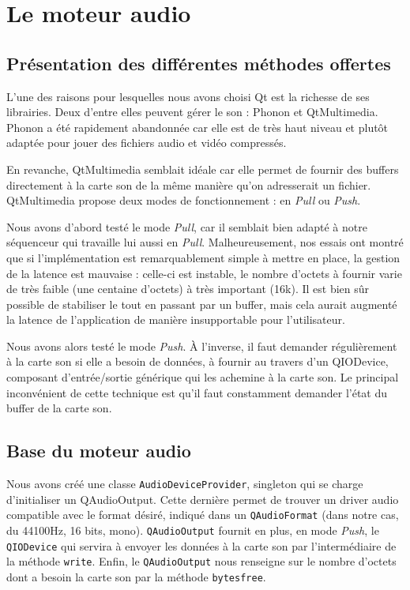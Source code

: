 \section{Le moteur audio}

\subsection{Présentation des différentes méthodes offertes}

L'une des raisons pour lesquelles nous avons choisi Qt est la
richesse de ses librairies. Deux d'entre elles peuvent gérer le son
: Phonon et QtMultimedia. Phonon a été rapidement abandonnée car
elle est de très haut niveau et plutôt adaptée pour jouer des
fichiers audio et vidéo compressés.

En revanche, QtMultimedia semblait idéale car elle permet de
fournir des buffers directement à la carte son de la même manière
qu'on adresserait un fichier. QtMultimedia propose deux modes de
fonctionnement : en \emph{Pull} ou \emph{Push}.

Nous avons d'abord testé le mode \emph{Pull}, car il semblait bien
adapté à notre séquenceur qui travaille lui aussi en \emph{Pull}.
Malheureusement, nos essais ont montré que si l'implémentation est
remarquablement simple à mettre en place, la gestion de la latence
est mauvaise : celle-ci est instable, le nombre d'octets à fournir
varie de très faible (une centaine d'octets) à très important
(16k). Il est bien sûr possible de stabiliser le tout en passant
par un buffer, mais cela aurait augmenté la latence de
l'application de manière insupportable pour l'utilisateur.

Nous avons alors testé le mode \emph{Push}. À l'inverse, il faut
demander régulièrement à la carte son si elle a besoin de données,
à fournir au travers d'un QIODevice, composant d'entrée/sortie
générique qui les achemine à la carte son. Le principal
inconvénient de cette technique est qu'il faut constamment demander
l'état du buffer de la carte son.

\subsection{Base du moteur audio}

Nous avons créé une classe \verb!AudioDeviceProvider!, singleton
qui se charge d'initialiser un QAudioOutput. Cette dernière permet
de trouver un driver audio compatible avec le format désiré,
indiqué dans un \verb!QAudioFormat! (dans notre cas, du 44100Hz, 16
bits, mono). \verb!QAudioOutput! fournit en plus, en mode
\emph{Push}, le \verb!QIODevice! qui servira à envoyer les données
à la carte son par l'intermédiaire de la méthode \verb!write!.
Enfin, le \verb!QAudioOutput! nous renseigne sur le nombre d'octets
dont a besoin la carte son par la méthode \verb!bytesfree!.

